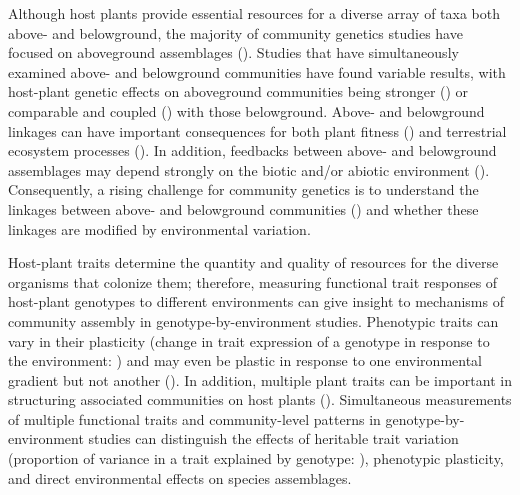 \documentclass[11pt]{article}
\begin{document}
Although host plants provide essential resources for a diverse array of
taxa both above- and belowground, the majority of community genetics
studies have focused on aboveground assemblages (\citealt{Whitham_2012}).
Studies that have simultaneously examined above- and belowground
communities have found variable results, with host-plant genetic effects
on aboveground communities being stronger
(\citealt{Crutsinger_2008, Bailey_2009}) or comparable and coupled
(\citealt{Crutsinger_2014}) with those belowground. Above- and belowground
linkages can have important consequences for both plant fitness
(\citealt{Whitham_2006}) and terrestrial ecosystem processes (\citealt{Wardle_2004}).
In addition, feedbacks between above- and belowground assemblages may
depend strongly on the biotic and/or abiotic environment
(\citealt{Wardle_2004}). Consequently, a rising challenge for community
genetics is to understand the linkages between above- and belowground
communities (\citealt{Crutsinger_2014, Lamit_2015}) and whether these
linkages are modified by environmental variation.

Host-plant traits determine the quantity and quality of resources for
the diverse organisms that colonize them; therefore, measuring
functional trait responses of host-plant genotypes to different
environments can give insight to mechanisms of community assembly in
genotype-by-environment studies. Phenotypic traits can vary in their
plasticity (change in trait expression of a genotype in response to the
environment: \citealt{Scheiner_1993}) and may even be plastic in response to
one environmental gradient but not another
(\citealt{Scheiner_1993, Scheiner_1984, Garbutt_1987}). In addition,
multiple plant traits can be important in structuring associated
communities on host plants
(\citealt{Barbour_2015, Barbour_2016, Agrawal_2006, agrawal2005natural, Agrawal_2004}).
Simultaneous measurements of multiple functional traits and
community-level patterns in genotype-by-environment studies can
distinguish the effects of heritable trait variation (proportion of
variance in a trait explained by genotype: \citealt{lynch1998genetics}),
phenotypic plasticity, and direct environmental effects on species
assemblages.
\end{document}
